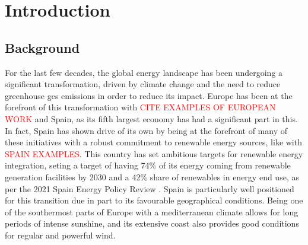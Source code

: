 \section{Introduction}
\subsection{Background}

For the last few decades, the global energy landscape has been undergoing a significant transformation, driven by climate change and the need to reduce greenhouse ges emissions in order to reduce its impact. Europe has been at the forefront of this transformation with \textcolor{red}{CITE EXAMPLES OF EUROPEAN WORK} and Spain, as its fifth largest economy has had a significant part in this. In fact, Spain has shown drive of its own by being at the forefront of many of these initiatives with a robust commitment to renewable energy sources, like with \textcolor{red}{SPAIN EXAMPLES}. This country has set ambitious targets for renewable energy integration, seting a target of having 74\% of its energy coming from renewable generation facilities by 2030 and a 42\% share of renewables in energy end use, as per the 2021 Spain Energy Policy Review \cite{energy_policy_review_spain_2021}. Spain is particularly well positioned for this transition due in part to its favourable geographical conditions. Being one of the southermost parts of Europe with a mediterranean climate allows for long periods of intense sunshine, and its extensive coast also provides good conditions for regular and powerful wind. 

